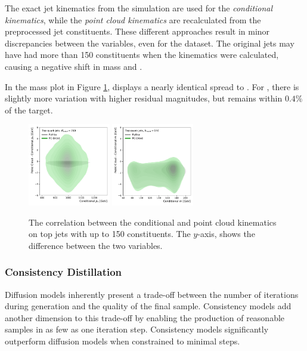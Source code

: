 The exact jet kinematics from the simulation are used for the \textit{conditional kinematics}, while the \textit{point cloud kinematics} are recalculated from the preprocessed jet constituents.
These different approaches result in minor discrepancies between the variables, even for the \pythia dataset.
The original jets may have had more than 150 constituents when the kinematics were calculated, causing a negative shift in mass and \pt.

In the mass plot in Figure \ref{fig:obedience}, \pcdroid displays a nearly identical spread to \pythia.
For \pt, there is slightly more variation with higher residual magnitudes, but \pcdroid remains within $0.4\%$ of the target.

\begin{figure}[htpb]
    \centering
    \includegraphics[width=0.32\textwidth]{Figures/jet_generation/droid/150/obedience/t/100/t_pt_PC-Droid_resid.pdf}
    \includegraphics[width=0.32\textwidth]{Figures/jet_generation/droid/150/obedience/t/100/t_mass_PC-Droid_resid.pdf}
    \caption{The correlation between the conditional and point cloud kinematics on top jets with up to 150 constituents. The $y$-axis, shows the difference between the two variables.}
    \label{fig:obedience}
\end{figure}

\subsubsection{Consistency Distillation}

Diffusion models inherently present a trade-off between the number of iterations during generation and the quality of the final sample.
Consistency models add another dimension to this trade-off by enabling the production of reasonable samples in as few as one iteration step.
Consistency models significantly outperform diffusion models when constrained to minimal steps.

